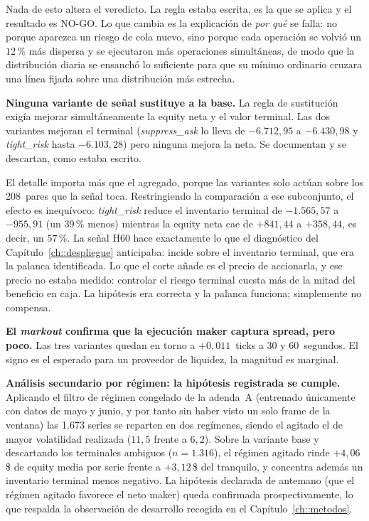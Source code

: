 Nada de esto altera el veredicto. La regla estaba escrita, es la que se aplica y el
resultado es NO-GO. Lo que cambia es la explicación de \emph{por qué} se falla: no porque
aparezca un riesgo de cola nuevo, sino porque cada operación se volvió un $12$\,\% más
dispersa y se ejecutaron más operaciones simultáneas, de modo que la distribución diaria
se ensanchó lo suficiente para que su mínimo ordinario cruzara una línea fijada sobre una
distribución más estrecha.

\textbf{Ninguna variante de señal sustituye a la base.} La regla de sustitución exigía
mejorar simultáneamente la equity neta y el valor terminal. Las dos variantes mejoran el
terminal (\emph{suppress\_ask} lo lleva de $-6.712{,}95$ a $-6.430{,}98$ y
\emph{tight\_risk} hasta $-6.103{,}28$) pero ninguna mejora la neta. Se documentan y se
descartan, como estaba escrito.

El detalle importa más que el agregado, porque las variantes solo actúan sobre los
208~pares que la señal toca. Restringiendo la comparación a ese subconjunto, el efecto
es inequívoco: \emph{tight\_risk} reduce el inventario terminal de $-1.565{,}57$ a
$-955{,}91$ (un $39$\,\% menos) mientras la equity neta cae de $+841{,}44$ a
$+358{,}44$, es decir, un $57$\,\%. La señal H60 hace exactamente lo que el diagnóstico
del Capítulo~\ref{ch::despliegue} anticipaba: incide sobre el inventario terminal, que
era la palanca identificada. Lo que el corte añade es el precio de accionarla, y ese
precio no estaba medido: controlar el riesgo terminal cuesta más de la mitad del
beneficio en caja. La hipótesis era correcta y la palanca funciona; simplemente no
compensa.

\textbf{El \emph{markout} confirma que la ejecución maker captura spread, pero poco.}
Las tres variantes quedan en torno a $+0{,}011$~ticks a 30 y 60~segundos. El signo es el
esperado para un proveedor de liquidez, la magnitud es marginal.

\textbf{Análisis secundario por régimen: la hipótesis registrada se cumple.} Aplicando
el filtro de régimen congelado de la adenda~A (entrenado únicamente con datos de mayo y junio, y por
tanto sin haber visto un solo frame de la ventana) las 1.673 series se reparten en dos
regímenes, siendo el agitado el de mayor volatilidad realizada ($11{,}5$ frente a
$6{,}2$). Sobre la variante base y descartando los terminales ambiguos ($n=1.316$), el
régimen agitado rinde $+4{,}06$\,\$ de equity media por serie frente a $+3{,}12$\,\$ del
tranquilo, y concentra además un inventario terminal menos negativo. La hipótesis
declarada de antemano (que el régimen agitado favorece el neto maker) queda confirmada
prospectivamente, lo que respalda la observación de desarrollo recogida en el
Capítulo~\ref{ch::metodos}.

